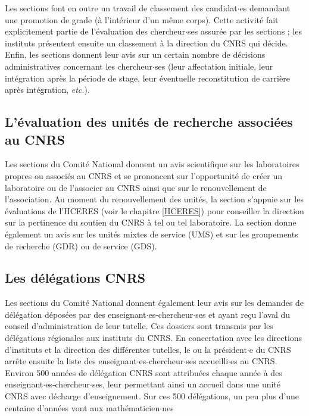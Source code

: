 Les sections  font en outre un travail de classement des candidat$\cdot$es
demandant une promotion de grade (\`a l'int\'erieur d'un m\^eme corps).
Cette activit\'e fait explicitement partie de l'\'evaluation des chercheur$\cdot$ses assur\'ee par les sections ; les instituts  pr\'esentent ensuite un classement \`a la direction du CNRS qui
d\'ecide.\\

Enfin, les sections donnent leur avis sur un certain
nombre de d\'ecisions administratives concernant les chercheur$\cdot$ses
(leur affectation initiale, leur int\'egration apr\`es la p\'eriode de stage,
leur \'eventuelle reconstitution de carri\`ere apr\`es
int\'egration, {{\em etc.}}).

\subsection{L'\'evaluation des unit\'es de recherche associ\'ees au
CNRS}

Les sections du Comit\'e National donnent un avis scientifique sur les laboratoires propres ou associ\'es au CNRS et se
prononcent sur l'opportunit\'e de cr\'eer un laboratoire ou de l'associer
au CNRS ainsi que sur le renouvellement de l'association. Au moment du renouvellement des unit\'es, la section s'appuie sur les \'evaluations de l'HCERES (voir le chapitre \ref{HCERES}) pour conseiller
la direction sur la pertinence du soutien du CNRS \`a tel ou tel laboratoire. La section donne \'egalement
un avis sur les unit\'es mixtes de service (UMS) et sur les
groupements de recherche (GDR) ou de service (GDS).



\subsection{Les d\'el\'egations CNRS}

Les sections du Comit\'e National donnent \'egalement leur avis sur les demandes
de d\'el\'egation d\'epos\'ees par des enseignant$\cdot$es-chercheur$\cdot$ses et ayant re\c cu l'aval du conseil d'administration de leur tutelle. Ces dossiers sont 
 transmis par les d\'el\'egations r\'egionales  aux instituts du CNRS.
En concertation avec les directions d'instituts et la direction des diff\'erentes tutelles,
le ou la pr\'esident$\cdot$e du CNRS arr\^ete ensuite la liste des enseignant$\cdot$es-chercheur$\cdot$ses accueilli$\cdot$es au CNRS. Environ 500 ann\'ees de d\'el\'egation CNRS sont attribu\'ees chaque ann\'ee \`a des enseignant$\cdot$es-chercheur$\cdot$ses, leur permettant ainsi un accueil dans une unit\'e CNRS avec d\'echarge d'enseignement. Sur ces 500 d\'el\'egations, un peu plus d'une centaine d'ann\'ees vont aux math\'ematicien$\cdot$nes 


